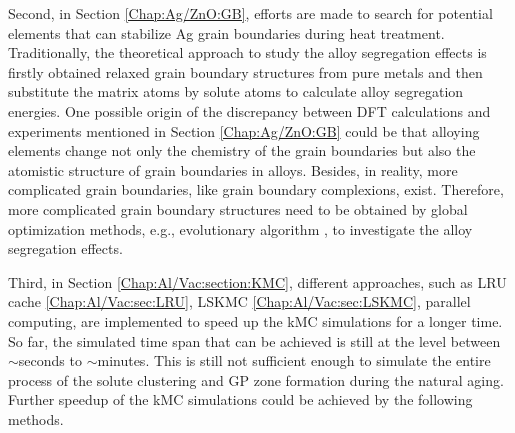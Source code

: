 Second, in Section \ref{Chap:Ag/ZnO:GB}, efforts are made to search for potential elements that can stabilize Ag grain boundaries during heat treatment. Traditionally, the theoretical approach to study the alloy segregation effects is firstly obtained relaxed grain boundary structures from pure metals and then substitute the matrix atoms by solute atoms to calculate alloy segregation energies. One possible origin of the discrepancy between DFT calculations and experiments mentioned in Section \ref{Chap:Ag/ZnO:GB} could be that alloying elements change not only the chemistry of the grain boundaries but also the atomistic structure of grain boundaries in alloys. Besides, in reality, more complicated grain boundaries, like grain boundary complexions, exist\cite{cantwell2014grain}. Therefore, more complicated grain boundary structures need to be obtained by global optimization methods, e.g., evolutionary algorithm \cite{yang2020grain}, to investigate the alloy segregation effects.

Third, in Section \ref{Chap:Al/Vac:section:KMC}, different approaches, such as \ac{LRU} cache \ref{Chap:Al/Vac:sec:LRU}, \ac{LSKMC} \ref{Chap:Al/Vac:sec:LSKMC}, parallel computing, are implemented to speed up the \ac{kMC} simulations for a longer time. So far, the simulated time span that can be achieved is still at the level between $\sim$seconds to $\sim$minutes. This is still not sufficient enough to simulate the entire process of the solute clustering and \ac{GP} zone formation during the natural aging. Further speedup of the \ac{kMC} simulations could be achieved by the following methods.

